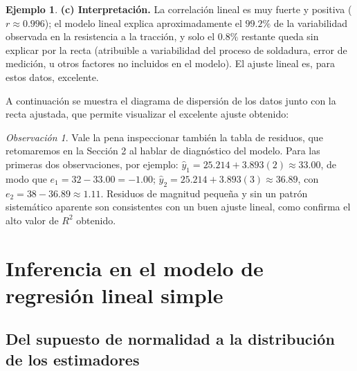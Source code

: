 \documentclass[11pt,a4paper]{article}
\theoremstyle{plain}
\theoremstyle{definition}
\newtheorem{ejemplo}[teorema]{Ejemplo}
\theoremstyle{remark}
\newtheorem{observacion}[teorema]{Observación}
\begin{document}
\begin{ejemplo}
\medskip
\noindent\textbf{(c) Interpretación.} La correlación lineal es muy fuerte y positiva ($r\approx0.996$); el modelo lineal explica aproximadamente el $99.2\%$ de la variabilidad observada en la resistencia a la tracción, y solo el $0.8\%$ restante queda sin explicar por la recta (atribuible a variabilidad del proceso de soldadura, error de medición, u otros factores no incluidos en el modelo). El ajuste lineal es, para estos datos, excelente.
\end{ejemplo}

A continuación se muestra el diagrama de dispersión de los datos junto con la recta ajustada, que permite visualizar el excelente ajuste obtenido:

\begin{center}
\end{center}

\begin{observacion}
Vale la pena inspeccionar también la tabla de residuos, que retomaremos en la Sección 2 al hablar de diagnóstico del modelo. Para las primeras dos observaciones, por ejemplo: $\hat y_1=25.214+3.893(2)\approx33.00$, de modo que $e_1=32-33.00=-1.00$; $\hat y_2=25.214+3.893(3)\approx36.89$, con $e_2=38-36.89\approx1.11$. Residuos de magnitud pequeña y sin un patrón sistemático aparente son consistentes con un buen ajuste lineal, como confirma el alto valor de $R^2$ obtenido.
\end{observacion}

\newpage
\section{Inferencia en el modelo de regresión lineal simple}

\subsection{Del supuesto de normalidad a la distribución de los estimadores}
\end{document}
